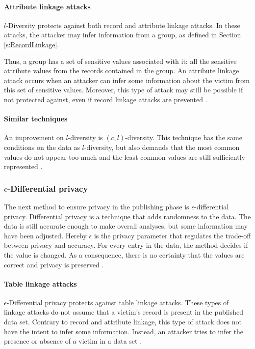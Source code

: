 		 \paragraph{Attribute linkage attacks}   
		  $l$-Diversity protects against both record and attribute linkage attacks.
		  In these attacks, the attacker may infer information from a group, as defined in Section \ref{s:RecordLinkage}.

		 Thus, a group has a set of sensitive values associated with it: all the sensitive attribute values from the records contained in the group.
		 An attribute linkage attack occurs when an attacker can infer some information about the victim from this set of sensitive values.
		 Moreover, this type of attack may still be possible if not protected against, even if record linkage attacks are prevented \cite{Fung2010}.
		 
		 \paragraph{Similar techniques}
		 An improvement on $l$-diversity is $(c,l)$-diversity.
		 This technique has the same conditions on the data as $l$-diversity,
		 but also demands that the most common values do not appear too much and the least common values are still sufficiently represented \cite{Fung2010}.
        
    \subsubsection{$\epsilon$-Differential privacy}
    The next method to ensure privacy in the publishing phase is $\epsilon$-differential privacy. 
    Differential privacy is a technique that adds randomness to the data.
    The data is still accurate enough to make overall analyses, but some information may have been adjusted. 
    Hereby $\epsilon$ is the privacy parameter that regulates the trade-off between privacy and accuracy. 
    For every entry in the data, the method decides if the value is changed.
    As a consequence, there is no certainty that the values are correct and privacy is preserved \cite{Mendes2017, Hsu_2014}.

		 \paragraph{Table linkage attacks}
			 
		 $\epsilon$-Differential privacy protects against table linkage attacks.
		 These types of linkage attacks do not assume that a victim's record is present in the published data set.
		 Contrary to record and attribute linkage, this type of attack does not have the intent to infer some information.
		 Instead, an attacker tries to infer the presence or absence of a victim in a data set \cite{Fung2010}.

